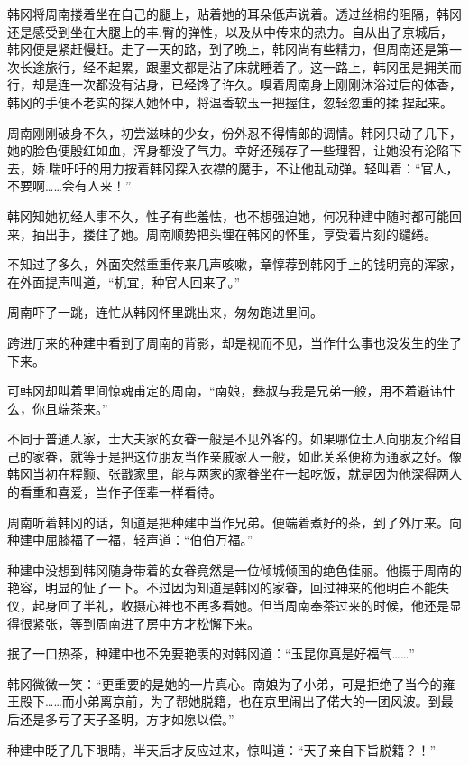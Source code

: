韩冈将周南搂着坐在自己的腿上，贴着她的耳朵低声说着。透过丝棉的阻隔，韩冈还是感受到坐在大腿上的丰.臀的弹性，以及从中传来的热力。自从出了京城后，韩冈便是紧赶慢赶。走了一天的路，到了晚上，韩冈尚有些精力，但周南还是第一次长途旅行，经不起累，跟墨文都是沾了床就睡着了。这一路上，韩冈虽是拥美而行，却是连一次都没有沾身，已经馋了许久。嗅着周南身上刚刚沐浴过后的体香，韩冈的手便不老实的探入她怀中，将温香软玉一把握住，忽轻忽重的揉.捏起来。

周南刚刚破身不久，初尝滋味的少女，份外忍不得情郎的调情。韩冈只动了几下，她的脸色便殷红如血，浑身都没了气力。幸好还残存了一些理智，让她没有沦陷下去，娇.喘吁吁的用力按着韩冈探入衣襟的魔手，不让他乱动弹。轻叫着：“官人，不要啊……会有人来！”

韩冈知她初经人事不久，性子有些羞怯，也不想强迫她，何况种建中随时都可能回来，抽出手，搂住了她。周南顺势把头埋在韩冈的怀里，享受着片刻的缱绻。

不知过了多久，外面突然重重传来几声咳嗽，章惇荐到韩冈手上的钱明亮的浑家，在外面提声叫道，“机宜，种官人回来了。”

周南吓了一跳，连忙从韩冈怀里跳出来，匆匆跑进里间。

跨进厅来的种建中看到了周南的背影，却是视而不见，当作什么事也没发生的坐了下来。

可韩冈却叫着里间惊魂甫定的周南，“南娘，彝叔与我是兄弟一般，用不着避讳什么，你且端茶来。”

不同于普通人家，士大夫家的女眷一般是不见外客的。如果哪位士人向朋友介绍自己的家眷，就等于是把这位朋友当作亲戚家人一般，如此关系便称为通家之好。像韩冈当初在程颢、张戬家里，能与两家的家眷坐在一起吃饭，就是因为他深得两人的看重和喜爱，当作子侄辈一样看待。

周南听着韩冈的话，知道是把种建中当作兄弟。便端着煮好的茶，到了外厅来。向种建中屈膝福了一福，轻声道：“伯伯万福。”

种建中没想到韩冈随身带着的女眷竟然是一位倾城倾国的绝色佳丽。他摄于周南的艳容，明显的怔了一下。不过因为知道是韩冈的家眷，回过神来的他明白不能失仪，起身回了半礼，收摄心神也不再多看她。但当周南奉茶过来的时候，他还是显得很紧张，等到周南进了房中方才松懈下来。

抿了一口热茶，种建中也不免要艳羡的对韩冈道：“玉昆你真是好福气……”

韩冈微微一笑：“更重要的是她的一片真心。南娘为了小弟，可是拒绝了当今的雍王殿下……而小弟离京前，为了帮她脱籍，也在京里闹出了偌大的一团风波。到最后还是多亏了天子圣明，方才如愿以偿。”

种建中眨了几下眼睛，半天后才反应过来，惊叫道：“天子亲自下旨脱籍？！”

